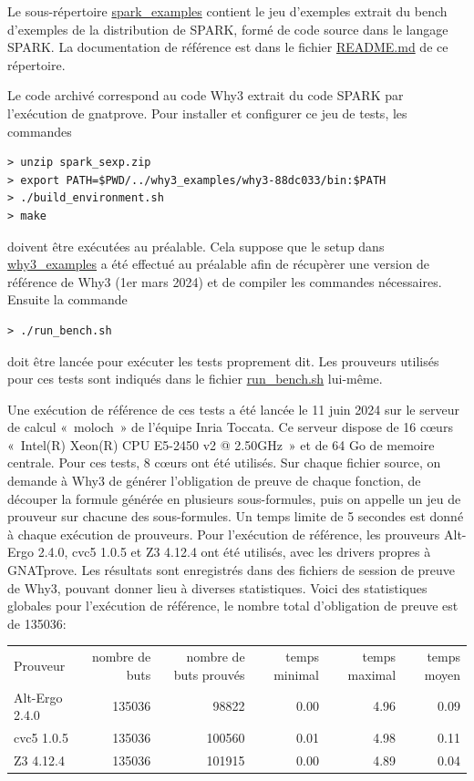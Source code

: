 \documentclass[a4paper,11pt]{article}
\begin{document}
Le sous-répertoire \url{spark_examples} contient le jeu d'exemples extrait du
bench d'exemples de la distribution de SPARK, formé de code source dans le
langage SPARK. La documentation de référence est dans le fichier
\url{README.md} de ce répertoire.

Le code archivé correspond au code Why3 extrait du code SPARK par l'exécution
de gnatprove. Pour installer et configurer ce jeu de tests, les commandes
\begin{lstlisting}
> unzip spark_sexp.zip
> export PATH=$PWD/../why3_examples/why3-88dc033/bin:$PATH
> ./build_environment.sh
> make
\end{lstlisting}
doivent être exécutées au préalable. Cela suppose que le setup dans \url{why3_examples}
a été effectué au préalable afin de récupèrer une version de
référence de Why3 (1er mars 2024) et de compiler les commandes nécessaires. Ensuite la commande
\begin{lstlisting}
> ./run_bench.sh
\end{lstlisting}
doit être lancée pour exécuter les tests proprement dit. Les prouveurs
utilisés pour ces tests sont indiqués dans le fichier
\url{run_bench.sh} lui-même.

Une exécution de référence de ces tests a été lancée le 11 juin 2024
sur le serveur de calcul «~moloch~» de l'équipe Inria Toccata. Ce
serveur dispose de 16 c{\oe}urs «~Intel(R) Xeon(R) CPU E5-2450 v2 @
2.50GHz~» et de 64 Go de memoire centrale. Pour ces tests, 8 c{\oe}urs
ont été utilisés. Sur chaque fichier source, on demande à Why3 de
générer l'obligation de preuve de chaque fonction, de découper la
formule générée en plusieurs sous-formules, puis on appelle un jeu de
prouveur sur chacune des sous-formules. Un temps limite de 5 secondes est donné à chaque exécution de prouveurs. Pour l'exécution de référence,
les prouveurs Alt-Ergo 2.4.0, cvc5 1.0.5 et Z3 4.12.4 ont
été utilisés, avec les drivers propres à GNATprove.
Les résultats sont enregistrés dans des fichiers de
session de preuve de Why3, pouvant donner lieu à diverses
statistiques. Voici des statistiques globales pour l'exécution de
référence, le nombre total d'obligation de preuve est de 135036:
\begin{center}
  \begin{tabular}{|l|r|r|r|r|r|}
    \hline
  \rowcolor{gray!50} Prouveur
  & \multicolumn{1}{p{0.13\textwidth}|}{nombre de buts}
  & \multicolumn{1}{p{0.13\textwidth}|}{nombre de buts prouvés}
  & \multicolumn{1}{p{0.13\textwidth}|}{temps minimal}
  & \multicolumn{1}{p{0.13\textwidth}|}{temps maximal}
  & \multicolumn{1}{p{0.13\textwidth}|}{temps moyen}
  \\
  Alt-Ergo 2.4.0                & 135036 &  98822 &  0.00  & 4.96 &  0.09 \\
  cvc5 1.0.5                    & 135036 & 100560 &  0.01  & 4.98 &  0.11 \\
  Z3 4.12.4                     & 135036 & 101915 &  0.00  & 4.89 &  0.04 \\
\hline
\end{tabular}
\end{center}
\end{document}
